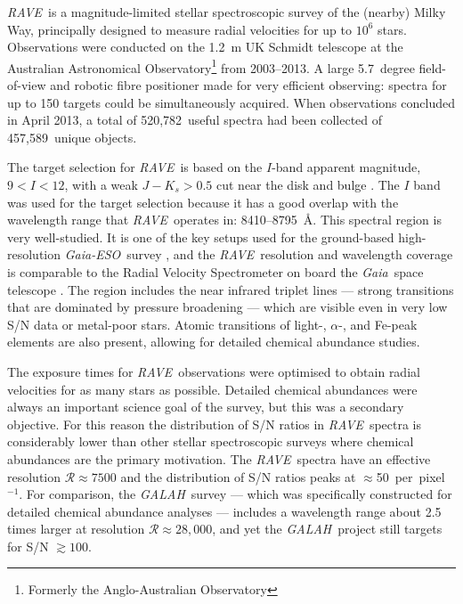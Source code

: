\documentclass[preprint,trackchanges]{aastex}
\newcommand{\acronym}[1]{{\small{#1}}}
\newcommand{\project}[1]{\textsl{#1}}
\newcommand{\gaia}{\project{Gaia}}
\newcommand{\rave}{\project{\acronym{RAVE}}}
\newcommand{\galah}{\project{\acronym{GALAH}}}
\newcommand{\ges}{\project{Gaia-ESO}}
\newcommand{\Nspectra}{520,782}
\newcommand{\Nstars}{457,589}
\begin{document}
\rave\ is a magnitude-limited stellar spectroscopic survey of the (nearby) Milky Way,
principally designed to measure radial velocities for up to $10^6$ stars.
Observations were conducted on the 1.2~m UK Schmidt telescope at the Australian 
Astronomical Observatory\footnote{Formerly the Anglo-Australian Observatory} from 
2003--2013.  A large 5.7~degree field-of-view and robotic fibre positioner made for 
very efficient observing:  spectra for up to 150 targets could be simultaneously
acquired.  When observations concluded in April 2013, a total of \Nspectra\ useful 
spectra had been collected of \Nstars\ unique objects. 


The target selection for \rave\ is based on the $I$-band apparent magnitude,
$9 < I < 12$, with a weak $J - K_s > 0.5$ cut near the disk and bulge \citep{Wonjo_2016}.  
The $I$ band was used for the target selection because it has a good overlap with the
wavelength range that \rave\ operates in:  8410--8795~\AA.  This spectral region 
is very well-studied.  It is one of the key setups used for the ground-based 
high-resolution \ges\ survey \citep{Gilmore_2012,Randich_2013}, and the 
\rave\ resolution and wavelength coverage is comparable to the Radial Velocity 
Spectrometer on board the \gaia\ space telescope \citep{Kordopatis_2011,Recio-Blanco_2016}.  
The region includes the  near infrared triplet lines --- strong 
transitions that are dominated by pressure broadening --- which are visible even 
in very low S/N data or metal-poor stars.  Atomic transitions of light-, $\alpha$-, 
and Fe-peak elements are also present, allowing for detailed chemical abundance studies.


The exposure times for \rave\ observations were optimised to obtain radial 
velocities for as many stars as possible.  Detailed chemical abundances were
always an important science goal of the survey, but this was a secondary objective.  
For this reason the distribution of S/N ratios in \rave\ spectra is considerably 
lower than other stellar spectroscopic surveys where chemical abundances are the 
primary motivation.  The \rave\ spectra have an effective resolution 
$\mathcal{R} \approx 7500$ and the distribution of S/N ratios peaks at 
$\approx$50~per~pixel$^{-1}$.  For comparison, the \galah\ survey 
\citep{DeSilva_2015} --- which was specifically constructed for detailed chemical 
abundance analyses --- includes a wavelength range about 2.5 times larger at 
resolution $\mathcal{R} \approx 28,000$, and yet the \galah\ project still 
targets for S/N $\gtrsim100$.
\end{document}
